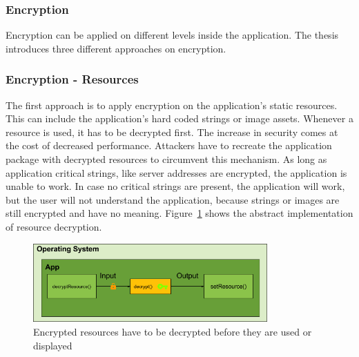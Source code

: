 \subsubsection{Encryption} \label{subsection:counter-replace-encryption-content}
Encryption can be applied on different levels inside the application.
The thesis introduces three different approaches on encryption.

\subsubsection{Encryption - Resources} \label{subsection:counter-replace-encryption-content-resource}
The first approach is to apply encryption on the application's static resources.
This can include the application's hard coded strings or image assets.
Whenever a resource is used, it has to be decrypted first.
The increase in security comes at the cost of decreased performance.
Attackers have to recreate the application package with decrypted resources to circumvent this mechanism.
\newline
As long as application critical strings, like server addresses are encrypted, the application is unable to work.
In case no critical strings are present, the application will work, but the user will not understand the application, because strings or images are still encrypted and have no meaning.
\newline
Figure~\ref{fig:encryptionResource} shows the abstract implementation of resource decryption.
\begin{figure}[h]
    \centering
    \includegraphics[width=0.8\textwidth]{data/encryptionResource.png}
    \caption{Encrypted resources have to be decrypted before they are used or displayed}
    \label{fig:encryptionResource}
\end{figure}

